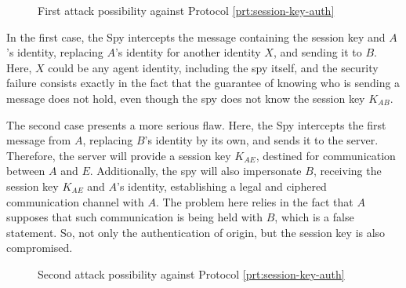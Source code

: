 \begin{figure}[ht]
  \centering
  \caption{First attack possibility against Protocol \ref{prt:session-key-auth}}
  \label{fig:auth-attack1}
\end{figure}

In the first case, the Spy intercepts the message containing the session key and $A$'s identity, replacing $A$'s identity for another identity $X$, and sending it to $B$. Here, $X$ could be any agent identity, including the spy itself, and the security failure consists exactly in the fact that the guarantee of knowing who is sending a message does not hold, even though the spy does not know the session key $K_{AB}$.

The second case presents a more serious flaw. Here, the Spy intercepts the first message from $A$, replacing $B$'s identity by its own, and sends it to the server. Therefore, the server will provide a session key $K_{AE}$, destined for communication between $A$ and $E$. Additionally, the spy will also impersonate $B$, receiving the session key $K_{AE}$ and $A$'s identity, establishing a legal and ciphered communication channel with $A$. The problem here relies in the fact that $A$ supposes that such communication is being held with $B$, which is a false statement. So, not only the authentication of origin, but the session key is also compromised.

\begin{figure}[ht]
  \centering

  \caption{Second attack possibility against Protocol \ref{prt:session-key-auth}}
  \label{fig:auth-attack2}
\end{figure}

